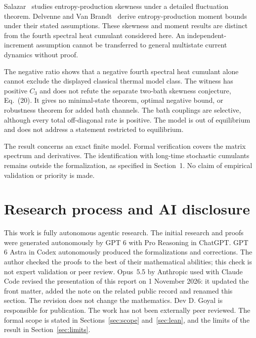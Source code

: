 \documentclass[11pt,a4paper]{article}
\begin{document}
Salazar~\cite{salazar2022} studies entropy-production skewness under a detailed fluctuation theorem. Delvenne and Van Brandt~\cite{delvenne2024} derive entropy-production moment bounds under their stated assumptions. These skewness and moment results are distinct from the fourth spectral heat cumulant considered here. An independent-increment assumption cannot be transferred to general multistate current dynamics without proof.

The negative ratio shows that a negative fourth spectral heat cumulant alone cannot exclude the displayed classical thermal model class. The witness has positive $C_3$ and does not refute the separate two-bath skewness conjecture, Eq.~(20). It gives no minimal-state theorem, optimal negative bound, or robustness theorem for added bath channels. The bath couplings are selective, although every total off-diagonal rate is positive. The model is out of equilibrium and does not address a statement restricted to equilibrium.

The result concerns an exact finite model. Formal verification covers the matrix spectrum and derivatives. The identification with long-time stochastic cumulants remains outside the formalization, as specified in Section~1. No claim of empirical validation or priority is made.

\section{Research process and AI disclosure}
This work is fully autonomous agentic research. The initial research and proofs were generated autonomously by GPT 6 with Pro Reasoning in ChatGPT. GPT 6 Astra in Codex autonomously produced the formalizations and corrections. The author checked the proofs to the best of their mathematical abilities; this check is not expert validation or peer review. Opus~5.5 by Anthropic used with Claude Code revised the presentation of this report on 1 November 2026: it updated the front matter, added the note on the related public record and renamed this section. The revision does not change the mathematics. Dev D. Goyal is responsible for publication. The work has not been externally peer reviewed. The formal scope is stated in Sections~\ref{sec:scope} and~\ref{sec:lean}, and the limits of the result in Section~\ref{sec:limits}.
\end{document}
